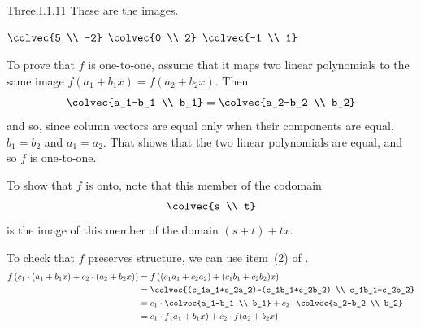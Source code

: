 \begin{ans}{Three.I.1.11}
       These are the images.
       \begin{exparts*}
        \partsitem \( \colvec{5 \\ -2} \)
        \partsitem \( \colvec{0 \\ 2} \)
        \partsitem \( \colvec{-1 \\ 1} \)
      \end{exparts*}

      To prove that $f$ is one-to-one, assume that it maps two linear
      polynomials to the same image $f(a_1+b_1x)=f(a_2+b_2x)$.
      Then
      \begin{equation*}
        \colvec{a_1-b_1 \\ b_1}=\colvec{a_2-b_2 \\ b_2}
      \end{equation*}
      and so, since column vectors are equal only when their components are
      equal, $b_1=b_2$ and $a_1=a_2$.
      That shows that the two linear polynomials are equal, and so $f$ is
      one-to-one.

      To show that $f$ is onto, note that this member of the codomain
      \begin{equation*}
         \colvec{s \\ t}
      \end{equation*}
      is the image of this member of the domain $(s+t)+tx$.

      To check that $f$ preserves structure,
      we can use item~(2) of .
      \begin{align*}
        f\left(c_1\cdot (a_1+b_1x)+c_2\cdot (a_2+b_2x)\right)
        &=f\left((c_1a_1+c_2a_2)+(c_1b_1+c_2b_2)x\right)                \\
        &=\colvec{(c_1a_1+c_2a_2)-(c_1b_1+c_2b_2) \\ c_1b_1+c_2b_2}       \\
        &=c_1\cdot\colvec{a_1-b_1 \\ b_1}+c_2\cdot\colvec{a_2-b_2 \\ b_2}  \\
        &=c_1\cdot f(a_1+b_1x)+c_2\cdot f(a_2+b_2x)
      \end{align*}
     
\end{ans}

